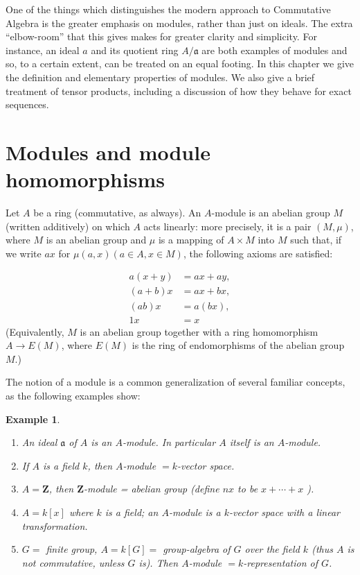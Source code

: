 \documentclass{standalone}
\newtheorem*{example}{Example}
\theoremstyle{definition}
\theoremstyle{remark}
\begin{document}
One of the things which distinguishes the modern approach to Commutative Algebra
is the greater emphasis on modules, rather than just on ideals. The extra
``elbow-room'' that this gives makes for greater clarity and simplicity. For
instance, an ideal $a$ and its quotient ring $A / \mathfrak{a}$ are both
examples of modules and so, to a certain extent, can be treated on an equal
footing. In this chapter we give the definition and elementary properties of
modules. We also give a brief treatment of tensor products, including a
discussion of how they behave for exact sequences.

\section{Modules and module homomorphisms}
Let $A$ be a ring (commutative, as always). An $A$-module is an abelian group
$M$ (written additively) on which $A$ acts linearly: more precisely, it is a
pair $(M, \mu)$, where $M$ is an abelian group and $\mu$ is a mapping of
$A \times M$ into $M$ such that, if we write $a x$ for
$\mu(a, x)(a \in A, x \in M)$, the following axioms are satisfied:

\begin{align*}
  a(x+y) & =a x+a y, \\
  (a+b) x & =a x+b x, \\
  (a b) x & =a(b x), \\
  1 x & =x \tag{$a,b\in A; x,y\in M$}
\end{align*}
(Equivalently, $M$ is an abelian group together with a ring homomorphism
$A \to E(M)$, where $E(M)$ is the ring of endomorphisms of the abelian group
$M$.)

The notion of a module is a common generalization of several familiar concepts,
as the following examples show:
\begin{example}
  \begin{enumerate}
    \item An ideal $\mathfrak{a}$ of $A$ is an $A$-module. In particular $A$
          itself is an $A$-module.
    \item If $A$ is a field $k$, then $A$-module $=k$-vector space.
    \item $A=\mathbf{Z}$, then $\mathbf{Z}$-module = abelian group (define $n x$
          to be $x+\cdots+x$ ).
    \item $A=k[x]$ where $k$ is a field; an $A$-module is a $k$-vector space
          with a linear transformation.
    \item $G=$ finite group, $A=k[G]=$ group-algebra of $G$ over the field $k$
          (thus $A$ is not commutative, unless $G$ is). Then $A$-module
          $=k$-representation of $G$.
  \end{enumerate}
\end{example}
\end{document}

